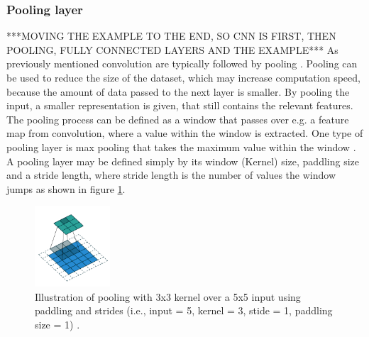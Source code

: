 \subsubsection{Pooling layer} ***MOVING THE EXAMPLE TO THE END, SO CNN IS FIRST, THEN POOLING, FULLY CONNECTED LAYERS AND THE EXAMPLE***
As previously mentioned convolution are typically followed by pooling \citep{LeCun2015, Goodfellow2016}. 
Pooling can be used to reduce the size of the dataset, which may increase computation speed, because the amount of data passed to the next layer is smaller. By pooling the input, a smaller representation is given, that still contains the relevant features.\citep{Goodfellow2016,LeCun1998}   
\noindent  
The pooling process can be defined as a window that passes over e.g. a feature map from convolution, where a value within the window is extracted. One type of pooling layer is max pooling that takes the maximum value within the window \citep{Goodfellow2016, Dumoulin2016}. A pooling layer may be defined simply by its window (Kernel) size, paddling size and a stride length, where stride length is the number of values the window jumps as shown in figure \ref{fig:Kernel}.\citep{Dumoulin2016}


\begin{figure} [H]
\centering
\includegraphics[width=0.25\textwidth]{figures/Kernel}
\caption{Illustration of pooling with 3x3 kernel over a 5x5 input using paddling and strides (i.e., input = 5, kernel = 3, stide = 1, paddling size = 1) \citep{Dumoulin2016}.}
\label{fig:Kernel}  
\end{figure}